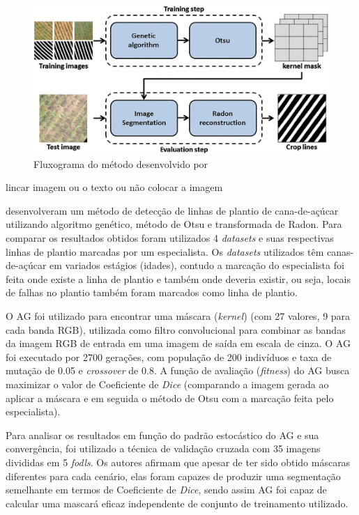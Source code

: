 \documentclass[12pt, a4paper, english, brazil]{article}
\newcommand{\textRed}[1]{{{\color{red} #1}}}
\begin{document}
\begin{figure}[htbp]
    \centering
    \includegraphics[width=0.6\textheight]{img/2021_Silva_flow_chart.png}
    \caption{Fluxograma do método desenvolvido por  }
    \label{fig:2021_silva_flow_chart}
\end{figure}

\textRed{lincar imagem ou o texto ou não colocar a imagem}

 desenvolveram um método de detecção de linhas de plantio de cana-de-açúcar utilizando algoritmo genético, método de Otsu e transformada de Radon. Para comparar os resultados obtidos foram utilizados 4 \textit{datasets} e suas respectivas linhas de plantio marcadas por um especialista. Os \textit{datasets} utilizados têm canas-de-açúcar em variados estágios (idades), \textRed{contudo} a marcação do especialista foi feita onde existe a linha de plantio e também onde deveria existir, ou seja, locais de falhas no plantio também foram marcados como linha de plantio.

O AG foi utilizado para encontrar uma máscara (\textit{kernel}) (com 27 valores, 9 para cada banda RGB), utilizada como filtro convolucional para combinar as bandas da imagem RGB de entrada em uma imagem de saída em escala de cinza. O AG foi executado por 2700 gerações, com população de 200 indivíduos e taxa de mutação de 0.05 e \textit{crossover} de 0.8. A função de avaliação (\textit{fitness}) do AG busca maximizar o valor de Coeficiente de \textit{Dice} (comparando a imagem gerada ao aplicar a máscara e em seguida o método de Otsu com a marcação feita pelo especialista).

Para analisar os resultados em função do padrão estocástico do AG e sua convergência, foi utilizado a técnica de validação cruzada com 35 imagens divididas em 5 \textit{fodls}. Os autores afirmam que apesar de ter sido obtido máscaras diferentes para cada cenário, elas foram capazes de produzir uma segmentação semelhante em termos de Coeficiente de \textit{Dice}, sendo assim AG foi capaz de calcular uma mascará eficaz independente de conjunto de treinamento utilizado.
\end{document}
